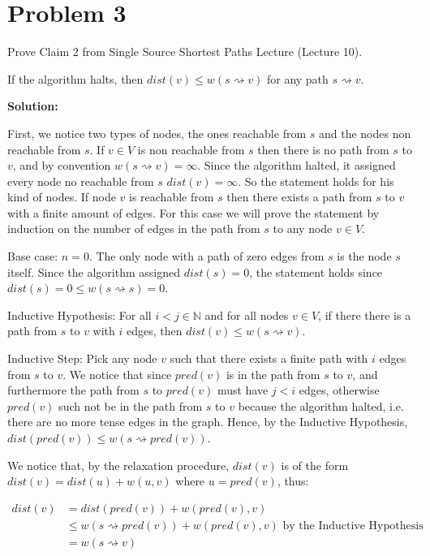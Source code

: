 \documentclass[a4paper, 11pt]{article}
\newcommand{\solution}{\textbf{Solution:}}
\begin{document}
\section*{Problem 3}

Prove Claim 2 from Single Source Shortest Paths Lecture (Lecture 10).

If the algorithm halts, then $dist(v) \leq w(s \rightsquigarrow v)$ for any path $s \rightsquigarrow v$.

\solution

First, we notice two types of nodes, the ones reachable from $s$ and the nodes non reachable from $s$. If $v \in V$ is non reachable from $s$ then there is no path from $s$ to $v$, and by convention $w(s \rightsquigarrow v) = \infty$. Since the algorithm halted, it assigned every node no reachable from $s$ $dist(v) = \infty$. So the statement holds for his kind of nodes. If node $v$ is reachable from $s$ then there exists a path from $s$ to $v$ with a finite amount of edges. For this case we will prove the statement by induction on the number of edges in the path from $s$ to any node $v \in V$. 

Base case: $n = 0$. The only node with a path of zero edges from $s$ is the node $s$ itself. Since the algorithm assigned $dist(s) = 0$, the statement holds since $dist(s) = 0 \leq w(s \rightsquigarrow s) = 0$.

Inductive Hypothesis: For all $i < j \in \mathbb{N}$ and for all nodes $v \in V$, if there there is a path from $s$ to $v$ with $i$ edges, then $dist(v) \leq w(s \rightsquigarrow v)$.

Inductive Step: Pick any node $v$ such that there exists a finite path with $i$ edges from $s$ to $v$. We notice that since $pred(v)$ is in the path from $s$ to $v$, and furthermore the path from $s$ to $pred(v)$ must have $j < i$ edges, otherwise $pred(v)$ such not be in the path from $s$ to $v$ because the algorithm halted, i.e. there are no more tense edges in the graph. Hence, by the Inductive Hypothesis, $dist(pred(v)) \leq w(s \rightsquigarrow pred(v))$.

We notice that, by the relaxation procedure, $dist(v)$ is of the form $dist(v) = dist(u) + w(u, v)$ where $u = pred(v)$, thus:

\begin{equation*}
	\begin{split}
		dist(v) &= dist(pred(v)) + w(pred(v), v)\\ 
		&\leq w(s \rightsquigarrow pred(v)) + w(pred(v), v) \text{ by the Inductive Hypothesis} \\
		&= w(s \rightsquigarrow v)
	\end{split}
\end{equation*}
\end{document}
